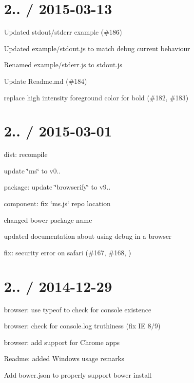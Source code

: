 \section*{2.. / 2015-\/03-\/13 }


\begin{DoxyItemize}
\item Updated stdout/stderr example (\#186)
\item Updated example/stdout.\+js to match debug current behaviour
\item Renamed example/stderr.\+js to stdout.\+js
\item Update Readme.\+md (\#184)
\item replace high intensity foreground color for bold (\#182, \#183)
\end{DoxyItemize}

\section*{2.. / 2015-\/03-\/01 }


\begin{DoxyItemize}
\item dist\+: recompile
\item update \char`\"{}ms\char`\"{} to v0..
\item package\+: update \char`\"{}browserify\char`\"{} to v9..
\item component\+: fix \char`\"{}ms.\+js\char`\"{} repo location
\item changed bower package name
\item updated documentation about using debug in a browser
\item fix\+: security error on safari (\#167, \#168, )
\end{DoxyItemize}

\section*{2.. / 2014-\/12-\/29 }


\begin{DoxyItemize}
\item browser\+: use {\ttfamily typeof} to check for {\ttfamily console} existence
\item browser\+: check for {\ttfamily console.\+log} truthiness (fix IE 8/9)
\item browser\+: add support for Chrome apps
\item Readme\+: added Windows usage remarks
\item Add {\ttfamily bower.\+json} to properly support bower install
\end{DoxyItemize}

